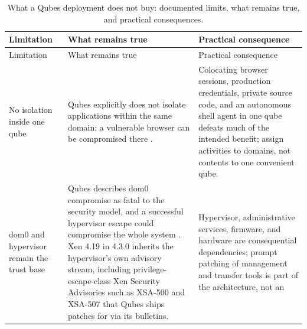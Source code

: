 \documentclass[
  english,
  9pt,
]{extarticle}
\begin{document}
\begin{longtable}[]{@{}
  >{\raggedright\arraybackslash}p{}
  >{\raggedright\arraybackslash}p{}
  >{\raggedright\arraybackslash}p{}@{}}
\caption{What a Qubes deployment does not buy: documented limits, what
remains true, and practical
consequences.}\label{tbl:qubes_limits}\tabularnewline
\toprule\noalign{}
\begin{minipage}[b]{\linewidth}\raggedright
Limitation
\end{minipage} & \begin{minipage}[b]{\linewidth}\raggedright
What remains true
\end{minipage} & \begin{minipage}[b]{\linewidth}\raggedright
Practical consequence
\end{minipage} \\
\midrule\noalign{}
\endfirsthead
\toprule\noalign{}
\begin{minipage}[b]{\linewidth}\raggedright
Limitation
\end{minipage} & \begin{minipage}[b]{\linewidth}\raggedright
What remains true
\end{minipage} & \begin{minipage}[b]{\linewidth}\raggedright
Practical consequence
\end{minipage} \\
\midrule\noalign{}
\endhead
\bottomrule\noalign{}
\endlastfoot
No isolation inside one qube & Qubes explicitly does not isolate
applications within the same domain; a vulnerable browser can be
compromised there \citep{qubes_security_design_goals}. & Colocating
browser sessions, production credentials, private source code, and an
autonomous shell agent in one qube defeats much of the intended benefit;
assign activities to domains, not contents to one convenient qube. \\
dom0 and hypervisor remain the trust base & Qubes describes dom0
compromise as fatal to the security model, and a successful hypervisor
escape could compromise the whole system
\citep{qubes_templates, qubes_faq}. Xen 4.19 in 4.3.0 inherits the
hypervisor's own advisory stream, including privilege-escape-class Xen
Security Advisories such as XSA-500 and XSA-507 that Qubes ships patches
for via its bulletins. & Hypervisor, administrative services, firmware,
and hardware are consequential dependencies; prompt patching of
management and transfer tools is part of the architecture, not an

\end{longtable}
\end{document}
